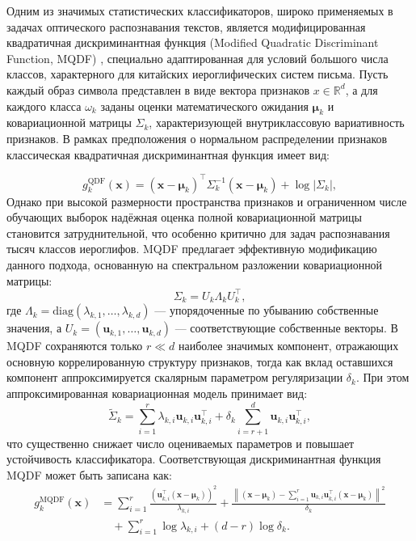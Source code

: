 Одним из значимых статистических классификаторов, широко применяемых в задачах оптического распознавания текстов, является модифицированная квадратичная дискриминантная функция (Modified Quadratic Discriminant Function, MQDF) \cite{kimura1987modified, wei2018compact}, специально адаптированная для условий большого числа классов, характерного для китайских иероглифических систем письма. Пусть каждый образ символа представлен в виде вектора признаков $x\in \mathbb{R}^d$, а для каждого класса $\omega_k$ заданы оценки математического ожидания $\boldsymbol{\mu}_k$ и ковариационной матрицы $\Sigma_k$, характеризующей внутриклассовую вариативность признаков. В рамках предположения о нормальном распределении признаков классическая квадратичная дискриминантная функция имеет вид:

\[
    g_k^{\mathrm{QDF}}(\mathbf{x}) =
    (\mathbf{x}-\boldsymbol{\mu}_k)^\top
    \Sigma_k^{-1}
    (\mathbf{x}-\boldsymbol{\mu}_k)
    +
    \log|\Sigma_k|,
\]
Однако при высокой размерности пространства признаков и ограниченном числе обучающих выборок надёжная оценка полной ковариационной матрицы становится затруднительной, что особенно критично для задач распознавания тысяч классов иероглифов. MQDF предлагает эффективную модификацию данного подхода, основанную на спектральном разложении ковариационной матрицы:
\[
    \Sigma_k = U_k \Lambda_k U_k^\top,
\]
где $\Lambda_k = \mathrm{diag}(\lambda_{k,1}, \ldots, \lambda_{k,d})$ — упорядоченные по убыванию собственные значения, а $U_k = (\mathbf{u}_{k,1}, \ldots, \mathbf{u}_{k,d})$ — соответствующие собственные векторы. В MQDF сохраняются только $r \ll d$ наиболее значимых компонент, отражающих основную коррелированную структуру признаков, тогда как вклад оставшихся компонент аппроксимируется скалярным параметром регуляризации $\delta_k$. При этом аппроксимированная ковариационная модель принимает вид:
\[
    \tilde{\Sigma}_k =
    \sum_{i=1}^{r}
    \lambda_{k,i}
    \mathbf{u}_{k,i}\mathbf{u}_{k,i}^\top
    +
    \delta_k
    \sum_{i=r+1}^{d}
    \mathbf{u}_{k,i}\mathbf{u}_{k,i}^\top,
\]
что существенно снижает число оцениваемых параметров и повышает устойчивость классификатора. Соответствующая дискриминантная функция MQDF может быть записана как:
\[
    \begin{aligned}
        g_k^{\mathrm{MQDF}}(\mathbf{x}) & =
        \sum_{i=1}^{r}
        \frac{
            \left(
            \mathbf{u}_{k,i}^\top
            (\mathbf{x}-\boldsymbol{\mu}_k)
            \right)^2
        }{\lambda_{k,i}}
        +
        \frac{
            \left\|
            (\mathbf{x}-\boldsymbol{\mu}_k)
            -
            \sum_{i=1}^{r}
            \mathbf{u}_{k,i}\mathbf{u}_{k,i}^\top
            (\mathbf{x}-\boldsymbol{\mu}_k)
            \right\|^2
        }{\delta_k}
        \\
                                        & \quad+
        \sum_{i=1}^{r}\log\lambda_{k,i}
        +
        (d-r)\log\delta_k.
    \end{aligned}
\]
